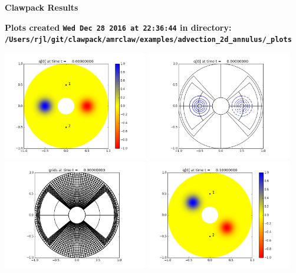 \documentclass[11pt]{article}
\begin{document}
        \begin{center}{\Large\bf Clawpack Results}\vskip 5pt
        
        \bf Plots created {\tt Wed Dec 28 2016 at 22:36:44} in directory: \vskip 5pt
        \verb+/Users/rjl/git/clawpack/amrclaw/examples/advection_2d_annulus/_plots+
        \end{center}
        \vskip 5pt
        \includegraphics[width=0.475\textwidth]{frame0000fig0.png}
\includegraphics[width=0.475\textwidth]{frame0000fig1.png}
\vskip 10pt 
\includegraphics[width=0.475\textwidth]{frame0000fig2.png}
\vskip 10pt 
\includegraphics[width=0.475\textwidth]{frame0001fig0.png}
\end{document}
